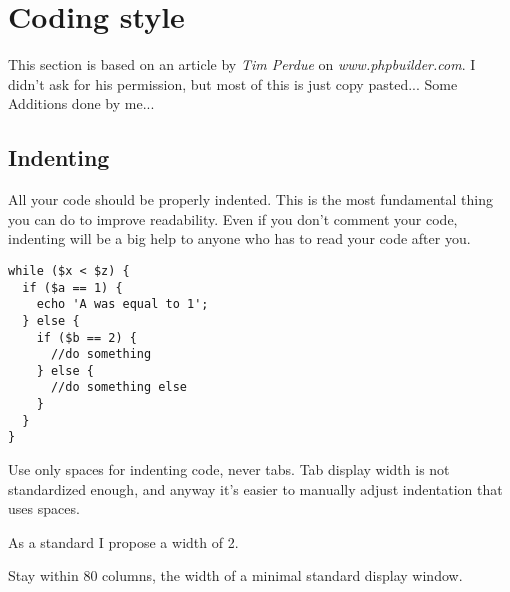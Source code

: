 

\renewcommand{\ElveInstitut}{Institut f\"{u}r Informatik und Praktische Mathematik}
\renewcommand{\ElveProf}{Prof. Dr. W.-P. de Roever}
\renewcommand{\ElveSemester}{WS 2004/05}
\renewcommand{\ElveName}{Jan Waller - PHP Gruppe 1}
\renewcommand{\ElveUebung}{P-I-T-M - Guidelines}
\lstset{language=PHP}


\thispagestyle{plain}
\tableofcontents

\section{Coding style}
    This section is based on an article by \emph{Tim Perdue} on \emph{www.phpbuilder.com}.
    I didn't ask for his permission, but most of this is just copy pasted... Some Additions done by me...

    \subsection{Indenting}
        All your code should be properly indented. This is the most fundamental thing you can do to
        improve readability. Even if you don't comment your code, indenting will be a big help to anyone
        who has to read your code after you.

        \begin{lstlisting}[stepnumber=0,frame={}]
while ($x < $z) {
  if ($a == 1) {
    echo 'A was equal to 1';
  } else {
    if ($b == 2) {
      //do something
    } else {
      //do something else
    }
  }
}
        \end{lstlisting}

        Use only spaces for indenting code, never tabs.  Tab display width is not standardized enough,
        and anyway it's easier to manually adjust indentation that uses spaces.

        As a standard I propose a width of 2.

        Stay within 80 columns, the width of a minimal standard display window.


